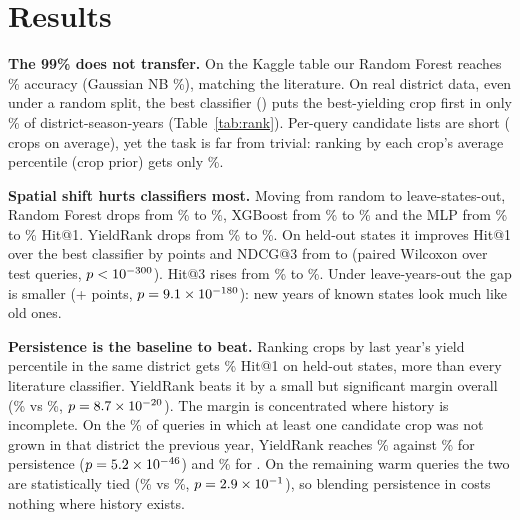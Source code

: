 \documentclass[conference]{IEEEtran}
\begin{document}
\section{Results}

\begin{table}[t]
\caption{Ranking the crops grown in a district-season by realised yield (mean$\pm$std over 5 folds). Hit@1: the top-ranked crop is the best-yielding one. $^{*}$/$^{**}$: YieldRank better or worse with Wilcoxon $p<0.05$/$p<0.001$ (paired over queries).}
\label{tab:rank}
\centering\footnotesize
\resizebox{\textwidth}{!}{}
\end{table}

\textbf{The 99\% does not transfer.} On the Kaggle table our Random Forest reaches \KaggleRF\%
accuracy (Gaussian NB \KaggleNB\%), matching the literature. On real district data, even under a
random split, the best classifier (\BaseNameR) puts the best-yielding crop first in only
\BaseHitR\% of district-season-years (Table~\ref{tab:rank}). Per-query candidate lists are
short (\MeanCand{} crops on average), yet the task is far from trivial: ranking by each crop's average
percentile (crop prior) gets only \PriorHitR\%.

\textbf{Spatial shift hurts classifiers most.} Moving from random to leave-states-out, Random
Forest drops from \RFHitR\% to \RFHitLSO\%, XGBoost from \XGBHitR\% to \XGBHitLSO\% and the MLP
from \MLPHitR\% to \MLPHitLSO\% Hit@1. YieldRank drops from \OursHitR\% to
\OursHitLSO\%. On held-out states it improves Hit@1 over the best classifier by \GainHitLSO{}
points and NDCG@3 from \BaseNDCGLSO{} to \OursNDCGLSO{} (paired Wilcoxon over
\NPairedLSO{} test queries, $p<10^{-300}$). Hit@3 rises from \BaseHitThreeLSO\% to
\OursHitThreeLSO\%. Under leave-years-out the gap is smaller (+\GainHitLYO{} points,
$p=9.1\times10^{-180}$): new years of known states look much like old ones.

\textbf{Persistence is the baseline to beat.} Ranking crops by last year's yield percentile in
the same district gets \PersHitLSO\% Hit@1 on held-out states, more than every literature
classifier. YieldRank beats it by a small but significant margin overall
(\OursHitLSO\% vs \PersHitLSO\%, $p=8.7\times10^{-20}$). The margin is concentrated where history is
incomplete. On the \ColdShareLSO\% of queries in which at least one candidate crop was not grown
in that district the previous year, YieldRank reaches \OursHitColdLSO\% against
\PersHitColdLSO\% for persistence ($p=5.2\times10^{-46}$) and \BaseHitColdLSO\% for \BaseNameLSO.
On the remaining warm queries the two are statistically tied (\OursHitWarmLSO\% vs
\PersHitWarmLSO\%, $p=2.9\times10^{-1}$), so blending persistence in costs nothing where history exists.
\end{document}

